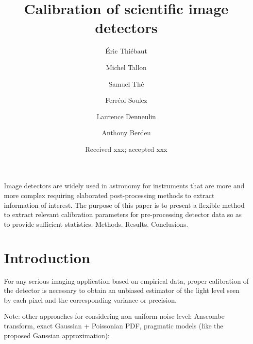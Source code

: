 \documentclass{aa}
\begin{document}
\title{Calibration of scientific image detectors}


\author{
  Éric Thiébaut
  \and Michel Tallon
  \and Samuel Thé
  \and Ferréol Soulez
  \and Laurence Denneulin
  \and Anthony Berdeu
}


\date{Received xxx; accepted xxx}

\abstract
{Image detectors are widely used in astronomy for instruments that are more
and more complex requiring elaborated post-processing methods to extract
information of interest.}
{The purpose of this paper is to present a flexible method to extract relevant
calibration parameters for pre-processing detector data so as to provide
sufficient statistics.}
{Methods.}
{Results.}
{Conclusions.}


 \maketitle
%

\section{Introduction}

For any serious imaging application based on empirical data, proper calibration
of the detector is necessary to obtain an unbiased estimator of the light level
seen by each pixel and the corresponding variance or precision.

Note: other approaches for considering non-uniform noise level: Anscombe
transform, exact Gaussian + Poissonian PDF, pragmatic models (like the
proposed Gaussian approximation):
\end{document}
